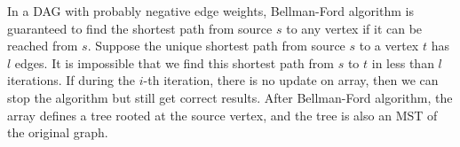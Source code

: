 \begin{parts}
    \begin{choices}
        \CorrectChoice In a DAG with probably negative edge weights, Bellman-Ford algorithm is guaranteed to find the shortest path from source $s$ to any vertex if it can be reached from $s$.
        \CorrectChoice Suppose the unique shortest path from source $s$ to a vertex $t$ has $l$ edges. It is impossible that we find this shortest path from $s$ to $t$ in less than $l$ iterations.
        \CorrectChoice If during the $i$-th iteration, there is no update on  array, then we can stop the algorithm but still get correct results.
        \choice After Bellman-Ford algorithm, the  array defines a tree rooted at the source vertex, and the tree is also an MST of the original graph.
    \end{choices}



\end{parts}


